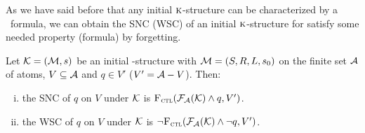 \documentclass{article}
\begin{document}
 As we have said before that any initial $\textsc{k}$-structure can be characterized by a \CTL\ formula, we can obtain the SNC (WSC) of an initial $\textsc{k}$-structure for satisfy some needed property (formula) by forgetting.
\begin{theorem}\label{thm:inK:SNC}
Let ${\cal K}= ({\cal M}, s)$ be an initial \MPK-structure with ${\cal M}=(S,R,L,s_0)$ on the finite set ${\cal A}$ of atoms, $V \subseteq {\cal A}$ and $q\in V'$ ($V' = {\cal A} - V$). Then:
 \begin{enumerate}[(i)]
   \item the SNC of $q$ on $V$ under ${\cal K}$ is ${\textsc{F}_{\textsc{ctl}}}({\cal F}_{{\cal A}}({\cal K}) \wedge q, V')$.
   \item the WSC of $q$ on $V$ under ${\cal K}$ is $\neg {\textsc{F}_{\textsc{ctl}}}({\cal F}_{{\cal A}}({\cal K}) \wedge \neg q, V')$.
 \end{enumerate}
\end{theorem}
%
\end{document}
